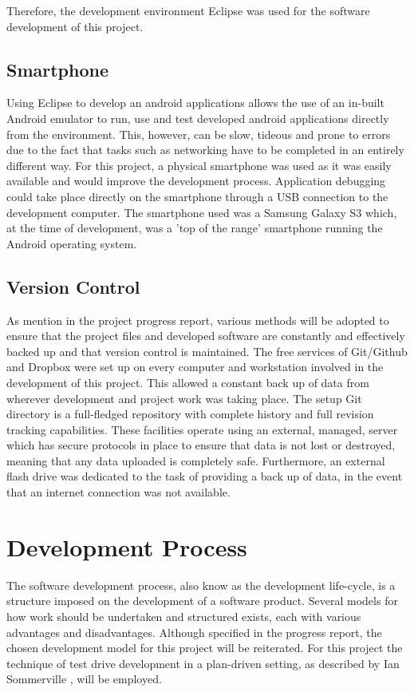 \documentclass[a4paper,10pt]{report}
\begin{document}
Therefore, the development environment Eclipse was used for the software development of this project. 

\subsection{Smartphone} 

Using Eclipse to develop an android applications allows the use of an in-built Android emulator to run, use and test developed android applications directly from the environment. This, however, can be slow, tideous and prone to errors due to the fact that tasks such as networking have to be completed in an entirely different way. For this project, a physical smartphone was used as it was easily available and would improve the development process. Application debugging could take place directly on the smartphone through a USB connection to the development computer. The smartphone used was a Samsung Galaxy S3 \cite{sthree} which, at the time of development, was a 'top of the range' smartphone running the Android operating system.

\subsection{Version Control}

As mention in the project progress report, various methods will be adopted to ensure that the project files and developed software are constantly and effectively backed up and that version control is maintained. The free services of Git/Github \cite{github} and Dropbox \cite{dropbox} were set up on every computer and workstation involved in the development of this project. This allowed a constant back up of data from wherever development and project work was taking place. The setup Git directory is a full-fledged repository with complete history and full revision tracking capabilities. These facilities operate using an external, managed, server which has secure protocols in place to ensure that data is not lost or destroyed, meaning that any data uploaded is completely safe. Furthermore, an external flash drive was dedicated to the task of providing a back up of data, in the event that an internet connection was not available. 

\section{Development Process}

The software development process, also know as the development life-cycle, is a structure imposed on the development of a software product. Several models for how work should be undertaken and structured exists, each with various advantages and disadvantages. Although specified in the progress report, the chosen development model for this project will be reiterated. For this project the technique of test drive development in a plan-driven setting, as described by Ian Sommerville \cite{iansommerville}, will be employed. 
\end{document}
